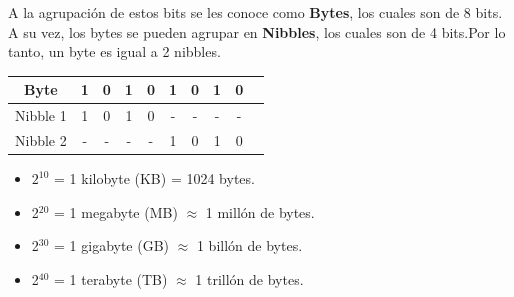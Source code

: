 \documentclass{templateNote}
\begin{document}
\noindent A la agrupación de estos bits se les conoce como \textbf{Bytes}, los cuales son de 8 bits. A su vez, los bytes se pueden agrupar en \textbf{Nibbles}, los cuales son de 4 bits.Por lo tanto, un byte es igual a 2 nibbles.
\begin{center}
    \begin{tabular}{|c|c|c|c|c|c|c|c|c|c|}
    \hline
    Byte & 1 & 0 & 1 & 0 & 1 & 0 & 1 & 0 \\
    \hline
    Nibble 1 & 1 & 0 & 1 & 0 & - & - & - & - \\
    Nibble 2 & - & - & - & - & 1 & 0 & 1 & 0 \\
    \hline
    \end{tabular}

    \begin{tcolorbox}[colback=green!10, colframe=green!80!black, title={Potencias de 2 importantes}]
        \begin{itemize}
            \item $2^{10}$ = 1 kilobyte (KB) = 1024 bytes.
            \item 2$^{20}$ = 1 megabyte (MB) $\approx$ 1 millón de bytes.
            \item 2$^{30}$ = 1 gigabyte (GB) $\approx$ 1 billón de bytes.
            \item 2$^{40}$ = 1 terabyte (TB) $\approx$ 1 trillón de bytes.
        \end{itemize}
    \end{tcolorbox}
\end{center}
\end{document}
